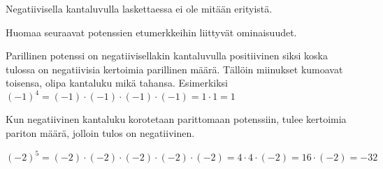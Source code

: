 Negatiivisella kantaluvulla laskettaessa ei ole mitään erityistä.
 
    \begin{esimerkki}

    \end{esimerkki}
    
Huomaa seuraavat potenssien etumerkkeihin liittyvät ominaisuudet.


Parillinen potenssi on negatiivisellakin kantaluvulla positiivinen siksi koska tulossa on negatiivisia kertoimia parillinen määrä. Tällöin miinukset kumoavat toisensa, olipa kantaluku mikä tahansa.  Esimerkiksi $(-1)^4=(-1) \cdot (-1) \cdot (-1) \cdot (-1)= 1\cdot 1=1$

Kun negatiivinen kantaluku korotetaan parittomaan potenssiin, tulee kertoimia pariton määrä, jolloin tulos on negatiivinen.
\begin{esimerkki}

$(-2)^5=(-2) \cdot (-2) \cdot (-2) \cdot (-2) \cdot (-2)=4\cdot4\cdot(-2)=16\cdot(-2)= -32$
\end{esimerkki}

